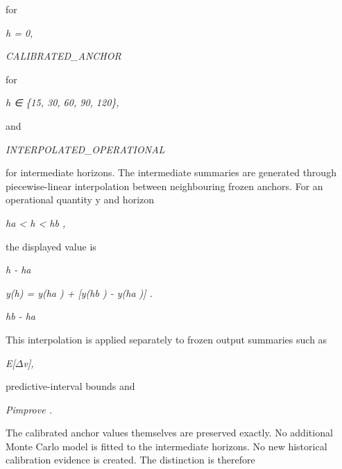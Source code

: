 for

\begin{center}\textit{h = 0,}\end{center}

\begin{center}\textit{CALIBRATED\_ANCHOR}\end{center}

for

\begin{center}\textit{h ∈ \{15, 30, 60, 90, 120\},}\end{center}

and

\begin{center}\textit{INTERPOLATED\_OPERATIONAL}\end{center}

for intermediate horizons. The intermediate summaries are generated through piecewise-linear interpolation between neighbouring frozen anchors. For an operational quantity y and horizon

\begin{center}\textit{ha < h < hb ,}\end{center}

the displayed value is

\begin{center}\textit{h - ha}\end{center}

\begin{center}\textit{y(h) = y(ha ) +            [y(hb ) - y(ha )] .}\end{center}

\begin{center}\textit{hb - ha}\end{center}

This interpolation is applied separately to frozen output summaries such as

\begin{center}\textit{E[\ensuremath{\Delta}v],}\end{center}

predictive-interval bounds and

\begin{center}\textit{Pimprove .}\end{center}

The calibrated anchor values themselves are preserved exactly. No additional Monte Carlo model is fitted to the intermediate horizons. No new historical calibration evidence is created. The distinction is therefore

